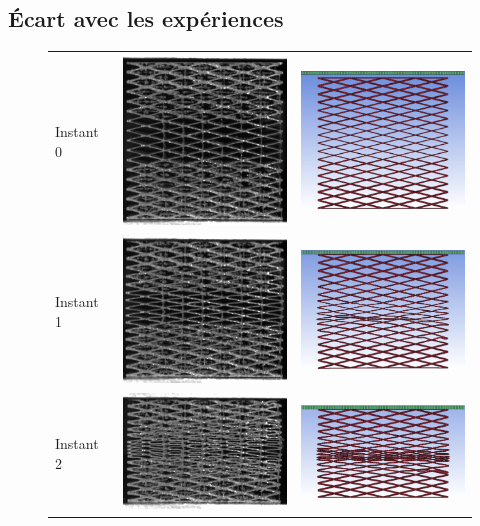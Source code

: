 \documentclass[a4paper]{article}
\begin{document}
	\subsection{Écart avec les expériences}
	\label{fem_res}
	\begin{figure}[!h]
		\centering
		\begin{tabular}{m{3cm}m{6cm}m{6cm}}
			Instant 0 & \includegraphics[width=5cm]{Images/8/8_3/exp1.png} & \includegraphics[width=5cm]{Images/8/8_3/ef1.png}\\
			Instant 1 & \includegraphics[width=5cm]{Images/8/8_3/exp2.png} & \includegraphics[width=5cm]{Images/8/8_3/ef2.png}\\
			Instant 2 & \includegraphics[width=5cm]{Images/8/8_3/exp3.png} & \includegraphics[width=5cm]{Images/8/8_3/ef3.png}\\

\end{tabular}
\end{figure}
\end{document}
